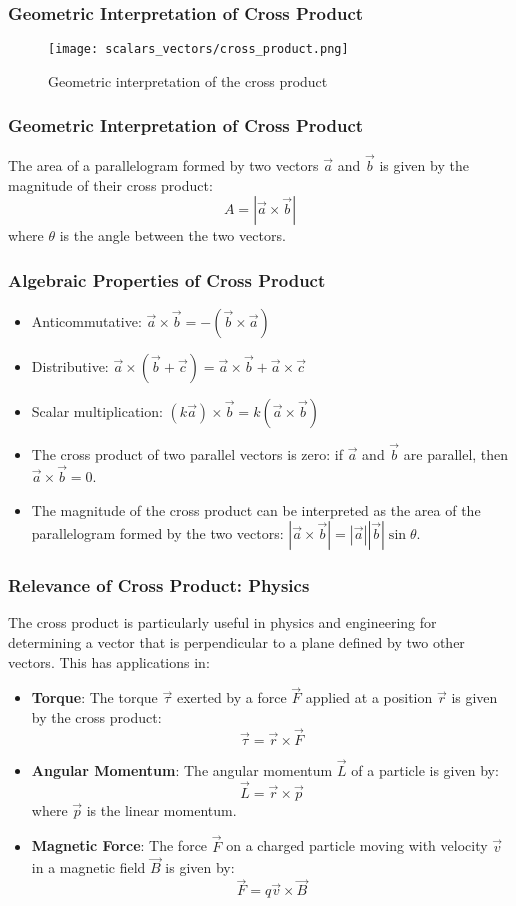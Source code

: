 \begin{frame}
\frametitle{Geometric Interpretation of Cross Product}
\begin{figure}
    \centering
    \texttt{[image: scalars\_vectors/cross\_product.png]}
    \caption{Geometric interpretation of the cross product}
\end{figure}
\end{frame} 

\begin{frame}
    \frametitle{Geometric Interpretation of Cross Product}
    The area of a parallelogram formed by two vectors \(\vec{a}\) and \(\vec{b}\) is given by the magnitude of their cross product:
    \[
    A = |\vec{a} \times \vec{b}|
    \]
    where \(\theta\) is the angle between the two vectors.

\end{frame}

\begin{frame}
    \frametitle{Algebraic Properties of Cross Product}
    \begin{itemize}
        \item Anticommutative: \(\vec{a} \times \vec{b} = -(\vec{b} \times \vec{a})\)
        \item Distributive: \(\vec{a} \times (\vec{b} + \vec{c}) = \vec{a} \times \vec{b} + \vec{a} \times \vec{c}\)
        \item Scalar multiplication: \((k \vec{a}) \times \vec{b} = k (\vec{a} \times \vec{b})\)
        \item The cross product of two parallel vectors is zero: if \(\vec{a}\) and \(\vec{b}\) are parallel, then \(\vec{a} \times \vec{b} = 0\).
        \item The magnitude of the cross product can be interpreted as the area of the parallelogram formed by the two vectors: \(|\vec{a} \times \vec{b}| = |\vec{a}| |\vec{b}| \sin \theta\).
    \end{itemize}
\end{frame}

\begin{frame}
    \frametitle{Relevance of Cross Product: Physics}
    The cross product is particularly useful in physics and engineering for determining a vector that is perpendicular to a plane defined by two other vectors. This has applications in:
    \begin{itemize}
        \item \textbf{Torque}: The torque \(\vec{\tau}\) exerted by a force \(\vec{F}\) applied at a position \(\vec{r}\) is given by the cross product:
        \[
        \vec{\tau} = \vec{r} \times \vec{F}
        \]
        \item \textbf{Angular Momentum}: The angular momentum \(\vec{L}\) of a particle is given by:
        \[
        \vec{L} = \vec{r} \times \vec{p}
        \]
        where \(\vec{p}\) is the linear momentum.
        \item \textbf{Magnetic Force}: The force \(\vec{F}\) on a charged particle moving with velocity \(\vec{v}\) in a magnetic field \(\vec{B}\) is given by:
        \[
        \vec{F} = q \vec{v} \times \vec{B}
        \]
    \end{itemize}
\end{frame}

